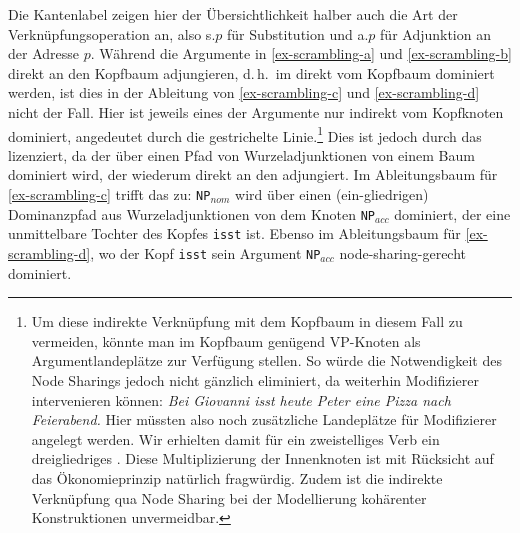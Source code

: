 Die Kantenlabel zeigen hier der Übersichtlichkeit halber auch die Art der Verknüpfungsoperation an, also {\sc s}.$p$ für Substitution und {\sc a}.$p$ für Adjunktion an der Adresse $p$. Während die Argumente in \ref{ex-scrambling-a} und \ref{ex-scrambling-b} direkt an den Kopfbaum adjungieren, d.\,h.\ im  direkt vom Kopfbaum dominiert werden, ist dies in der Ableitung von \ref{ex-scrambling-c} und \ref{ex-scrambling-d} nicht der Fall. Hier ist jeweils eines der Argumente nur indirekt vom Kopfknoten dominiert, angedeutet durch die gestrichelte Linie.\footnote{Um diese indirekte Verknüpfung mit dem Kopfbaum in diesem Fall zu vermeiden, könnte man im Kopfbaum genügend VP-Knoten als Argumentlandeplätze zur Verfügung stellen. So würde die Notwendigkeit des Node Sharings jedoch nicht gänzlich eliminiert, da weiterhin Modifizierer intervenieren können: {\it Bei Giovanni isst heute Peter eine Pizza nach Feierabend.} Hier müssten also noch zusätzliche Landeplätze für Modifizierer angelegt werden. Wir erhielten damit für ein zweistelliges Verb ein dreigliedriges . Diese Multiplizierung der Innenknoten ist mit Rücksicht auf das Ökonomieprinzip natürlich fragwürdig. Zudem ist die indirekte Verknüpfung qua Node Sharing bei der Modellierung kohärenter Konstruktionen unvermeidbar.} Dies ist jedoch durch das  lizenziert, da der  über einen Pfad von Wurzeladjunktionen von einem Baum dominiert wird, der wiederum direkt an den  adjungiert. Im Ableitungsbaum für \ref{ex-scrambling-c} trifft das zu: {\tt NP$_{nom}$} wird über einen (ein-gliedrigen) Dominanzpfad aus Wurzeladjunktionen von dem Knoten {\tt NP$_{acc}$} dominiert, der eine unmittelbare Tochter des Kopfes {\tt isst} ist. Ebenso im Ableitungsbaum für \ref{ex-scrambling-d}, wo der Kopf {\tt isst} sein Argument {\tt NP$_{acc}$} node-sharing-gerecht dominiert.

